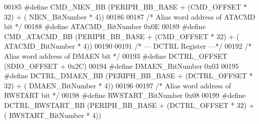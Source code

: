 \begin{DoxyCode}
00185 \textcolor{preprocessor}{#}\textcolor{preprocessor}{define} \textcolor{preprocessor}{CMD\_NIEN\_BB}               \textcolor{preprocessor}{(}PERIPH_BB_BASE \textcolor{preprocessor}{+} \textcolor{preprocessor}{(}CMD_OFFSET \textcolor{preprocessor}{*} 32\textcolor{preprocessor}{)} \textcolor{preprocessor}{+} \textcolor{preprocessor}{(}
      NIEN_BitNumber \textcolor{preprocessor}{*} 4\textcolor{preprocessor}{)}\textcolor{preprocessor}{)}
00186 
00187 \textcolor{comment}{/* Alias word address of ATACMD bit */}
00188 \textcolor{preprocessor}{#}\textcolor{preprocessor}{define} \textcolor{preprocessor}{ATACMD\_BitNumber}          0x0E
00189 \textcolor{preprocessor}{#}\textcolor{preprocessor}{define} \textcolor{preprocessor}{CMD\_ATACMD\_BB}             \textcolor{preprocessor}{(}PERIPH_BB_BASE \textcolor{preprocessor}{+} \textcolor{preprocessor}{(}CMD_OFFSET \textcolor{preprocessor}{*} 32\textcolor{preprocessor}{)} \textcolor{preprocessor}{+} \textcolor{preprocessor}{(}
      ATACMD_BitNumber \textcolor{preprocessor}{*} 4\textcolor{preprocessor}{)}\textcolor{preprocessor}{)}
00190 
00191 \textcolor{comment}{/* --- DCTRL Register ---*/}
00192 \textcolor{comment}{/* Alias word address of DMAEN bit */}
00193 \textcolor{preprocessor}{#}\textcolor{preprocessor}{define} \textcolor{preprocessor}{DCTRL\_OFFSET}              \textcolor{preprocessor}{(}SDIO_OFFSET \textcolor{preprocessor}{+} 0x2C\textcolor{preprocessor}{)}
00194 \textcolor{preprocessor}{#}\textcolor{preprocessor}{define} \textcolor{preprocessor}{DMAEN\_BitNumber}           0x03
00195 \textcolor{preprocessor}{#}\textcolor{preprocessor}{define} \textcolor{preprocessor}{DCTRL\_DMAEN\_BB}            \textcolor{preprocessor}{(}PERIPH_BB_BASE \textcolor{preprocessor}{+} \textcolor{preprocessor}{(}DCTRL_OFFSET \textcolor{preprocessor}{*} 32\textcolor{preprocessor}{)} \textcolor{preprocessor}{+} \textcolor{preprocessor}{(}
      DMAEN_BitNumber \textcolor{preprocessor}{*} 4\textcolor{preprocessor}{)}\textcolor{preprocessor}{)}
00196 
00197 \textcolor{comment}{/* Alias word address of RWSTART bit */}
00198 \textcolor{preprocessor}{#}\textcolor{preprocessor}{define} \textcolor{preprocessor}{RWSTART\_BitNumber}         0x08
00199 \textcolor{preprocessor}{#}\textcolor{preprocessor}{define} \textcolor{preprocessor}{DCTRL\_RWSTART\_BB}          \textcolor{preprocessor}{(}PERIPH_BB_BASE \textcolor{preprocessor}{+} \textcolor{preprocessor}{(}DCTRL_OFFSET \textcolor{preprocessor}{*} 32\textcolor{preprocessor}{)} \textcolor{preprocessor}{+} \textcolor{preprocessor}{(}
      RWSTART_BitNumber \textcolor{preprocessor}{*} 4\textcolor{preprocessor}{)}\textcolor{preprocessor}{)}

\end{DoxyCode}
